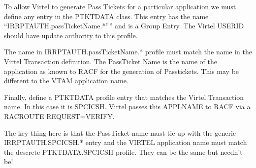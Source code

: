 \documentclass[letterpaper,10pt,english]{sphinxmanual}
\begin{document}
\sphinxAtStartPar
To allow Virtel to generate Pass Tickets for a particular application we must define any entry in the PTKTDATA class. This entry has the name “IRRPTAUTH.passTicketName.*”” and is a Group Entry. The Virtel USERID should have update authority to this profile.

\sphinxAtStartPar
{} 

\begin{sphinxVerbatim}[commandchars=\\\{\}]
  \PYGZbs{} 
 \PYGZbs{}   
 
\end{sphinxVerbatim}

\sphinxAtStartPar
The name in IRRPTAUTH.passTicketName.* profile must match the name in the Virtel Transaction definition. The PassTicket Name is the name of the application as known to RACF for the generation of Passtickets. This may be different to the VTAM application name.

\sphinxAtStartPar
Finally, define a PTKTDATA profile entry that matches the Virtel Transaction  name. In this case it is SPCICSH. Virtel passes this APPLNAME to RACF via a RACROUTE REQUEST=VERIFY.

\sphinxAtStartPar
{} 

\begin{sphinxVerbatim}[commandchars=\\\{\}]
    
\end{sphinxVerbatim}

\sphinxAtStartPar
The key thing here is that the PassTicket name must tie up with the generic IRRPTAUTH.SPCICSH.* entry and the VIRTEL application name must match the descrete PTKTDATA.SPCICSH profile. They can be the same but needn’t be!
\end{document}
